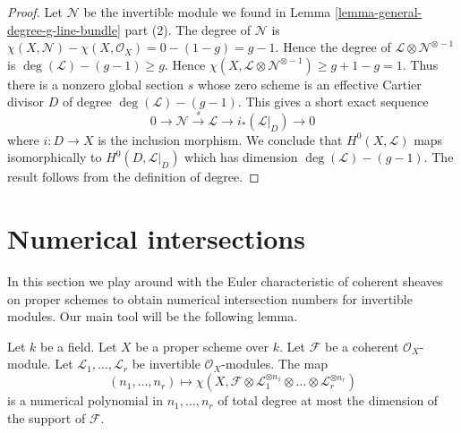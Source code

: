 \begin{proof}
Let $\mathcal{N}$ be the invertible module we found in
Lemma \ref{lemma-general-degree-g-line-bundle} part (2).
The degree of $\mathcal{N}$ is
$\chi(X, \mathcal{N}) - \chi(X, \mathcal{O}_X) = 0 - (1 - g) = g - 1$.
Hence the degree of $\mathcal{L} \otimes \mathcal{N}^{\otimes - 1}$
is $\deg(\mathcal{L}) - (g - 1) \geq g$.
Hence
$\chi(X, \mathcal{L} \otimes \mathcal{N}^{\otimes -1}) \geq g + 1 - g = 1$.
Thus there is a nonzero global section $s$ whose zero scheme is an
effective Cartier divisor $D$ of degree $\deg(\mathcal{L}) - (g - 1)$.
This gives a short exact sequence
$$
0 \to \mathcal{N} \xrightarrow{s} \mathcal{L} \to i_*(\mathcal{L}|_D) \to 0
$$
where $i : D \to X$ is the inclusion morphism. We conclude that
$H^0(X, \mathcal{L})$ maps isomorphically to $H^0(D, \mathcal{L}|_D)$
which has dimension $\deg(\mathcal{L}) - (g - 1)$. The result follows
from the definition of degree.
\end{proof}






\section{Numerical intersections}
\label{section-num}

\noindent
In this section we play around with the Euler characteristic of
coherent sheaves on proper schemes to obtain numerical intersection
numbers for invertible modules. Our main tool will be the following
lemma.

\begin{lemma}
\label{lemma-numerical-polynomial-from-euler}
Let $k$ be a field. Let $X$ be a proper scheme over $k$. Let $\mathcal{F}$
be a coherent $\mathcal{O}_X$-module. Let
$\mathcal{L}_1, \ldots, \mathcal{L}_r$ be invertible $\mathcal{O}_X$-modules.
The map
$$
(n_1, \ldots, n_r) \longmapsto
\chi(X, \mathcal{F} \otimes
\mathcal{L}_1^{\otimes n_1} \otimes \ldots \otimes
\mathcal{L}_r^{\otimes n_r})
$$
is a numerical polynomial in $n_1, \ldots, n_r$ of total degree at
most the dimension of the support of $\mathcal{F}$.
\end{lemma}

